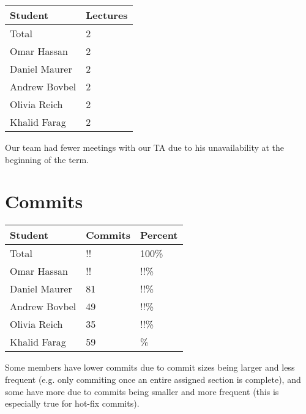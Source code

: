 \documentclass{article}
\begin{document}
\begin{table}[H]
\centering
\begin{tabular}{ll}
\toprule
\textbf{Student} & \textbf{Lectures}\\
\midrule
Total & 2\\
Omar Hassan & 2\\
Daniel Maurer & 2\\
Andrew Bovbel & 2\\
Olivia Reich & 2\\
Khalid Farag & 2\\
\bottomrule
\end{tabular}
\end{table}

Our team had fewer meetings with our TA due to his unavailability at the beginning of the term.

\section{Commits}
\iffalse
\wss{For each team member how many commits to the main branch have been made
over the time period of interest.  The total is the total number of commits for
the entire team since the beginning of the term.  The percentage is the
percentage of the total commits made by each team member.}
\fi
\begin{table}[H]
\centering
\begin{tabular}{lll}
\toprule
\textbf{Student} & \textbf{Commits} & \textbf{Percent}\\
\midrule
Total & !! & 100\% \\
Omar Hassan & !! & !!\%\\ %
Daniel Maurer & 81 & !!\%\\
Andrew Bovbel & 49 & !!\%\\
Olivia Reich & 35 & !!\%\\
Khalid Farag & 59 & \%\\
\bottomrule
\end{tabular}
\end{table}

\iffalse
\wss{If needed, an explanation for the counts can be provided here.  For
instance, if a team member has more commits to unmerged branches, these numbers
can be provided here.  If multiple people contribute to a commit, git allows for
multi-author commits.}
\fi

Some members have lower commits due to commit sizes being larger and less frequent (e.g. only commiting once an entire assigned
section is complete), and some have more due to commits being smaller and more frequent (this is especially true for hot-fix commits).
\end{document}
